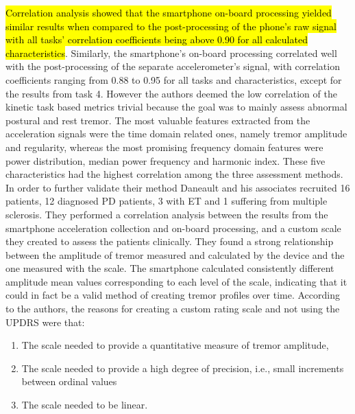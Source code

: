 \hl{Correlation analysis showed that the smartphone on-board processing yielded similar results when compared to the post-processing of the phone's raw signal with all tasks' correlation coefficients being above 0.90 for all calculated characteristics}. Similarly, the smartphone's on-board processing correlated well with the post-processing of the separate accelerometer's signal, with correlation coefficients ranging from 0.88 to 0.95 for all tasks and characteristics, except for the results from task 4. However the authors deemed the low correlation of the kinetic task based metrics trivial because the goal was to mainly assess abnormal postural and rest tremor. The most valuable features extracted from the acceleration signals were the time domain related ones, namely tremor amplitude and regularity, whereas the most promising frequency domain features were power distribution, median power frequency and harmonic index. These five characteristics had the highest correlation among the three assessment methods. In order to further validate their method Daneault and his associates recruited 16 patients, 12 diagnosed PD patients, 3 with ET and 1 suffering from multiple sclerosis. They performed a correlation analysis between the results from the smartphone acceleration collection and on-board processing, and a custom scale they created to assess the patients clinically. They found a strong relationship between the amplitude of tremor measured and calculated by the device and the one measured with the scale. The smartphone calculated consistently different amplitude mean values corresponding to each level of the scale, indicating that it could in fact be a valid method of creating tremor profiles over time. 
According to the authors, the reasons for creating a custom rating scale and not using the UPDRS were that:\par
\begin{enumerate}
\item The scale needed to provide a quantitative measure of tremor amplitude, 
\item The scale needed to provide a high degree of precision, i.e., small increments between ordinal values
\item The scale needed to be linear.
\end{enumerate}





